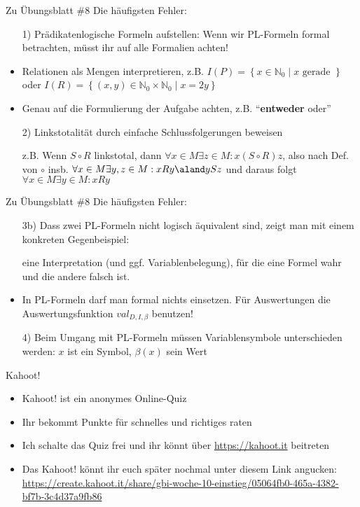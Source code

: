 \begin{frame}{Zu Übungsblatt \#8}
	Die häufigsten Fehler:
	\begin{itemize}[<+->]
		\item[1)] Prädikatenlogische Formeln aufstellen: Wenn wir PL-Formeln formal betrachten, müsst ihr auf alle Formalien achten!
		\item Relationen als Mengen interpretieren, z.B. $I(P)=\left\{ x \in \mathbb{N}_0 \middle| x \text{ gerade }\right\}$ oder $I(R)= \left\{(x,y) \in \mathbb{N}_0 \times \mathbb{N}_0 \middle| x = 2y \right\}$
		\item Genau auf die Formulierung der Aufgabe achten, z.B. ``\textbf{entweder} oder''
		\item[2)] Linkstotalität durch einfache Schlussfolgerungen beweisen
		\item[] z.B. Wenn $S\circ R$ linkstotal, dann $\forall x \in M \exists z\in M : x(S\circ R)z$, also nach Def. von $\circ$ insb. $\forall x\in M \exists y,z\in M : xRy \aland ySz$ und daraus folgt $\forall x \in M \exists y \in M : xRy$
	\end{itemize}
\end{frame}

\begin{frame}{Zu Übungsblatt \#8}
	Die häufigsten Fehler:
	\begin{itemize}[<+->]
		\item[3b)] Dass zwei PL-Formeln nicht logisch äquivalent sind, zeigt man mit einem konkreten Gegenbeispiel:
		\item[] eine Interpretation (und ggf. Variablenbelegung), für die eine Formel wahr und die andere falsch ist.
		\item In PL-Formeln darf man formal nichts einsetzen. Für Auswertungen die Auswertungsfunktion $val_{D,I,\beta}$ benutzen!
		\item[4)] Beim Umgang mit PL-Formeln müssen Variablensymbole unterschieden werden: $x$ ist ein Symbol, $\beta(x)$ sein Wert
	\end{itemize}
\end{frame}



\framePrevEpisode

\begin{frame}{Kahoot!}
	\begin{itemize}[<+->]
		\item Kahoot! ist ein anonymes Online-Quiz
		\item Ihr bekommt Punkte für schnelles und richtiges raten
		\item Ich schalte das Quiz frei und ihr könnt über \url{https://kahoot.it} beitreten
		\item Das Kahoot! könnt ihr euch später nochmal unter diesem Link angucken: \\
			\url{https://create.kahoot.it/share/gbi-woche-10-einstieg/05064fb0-465a-4382-bf7b-3c4d37a9fb86}
	\end{itemize}
\end{frame}


